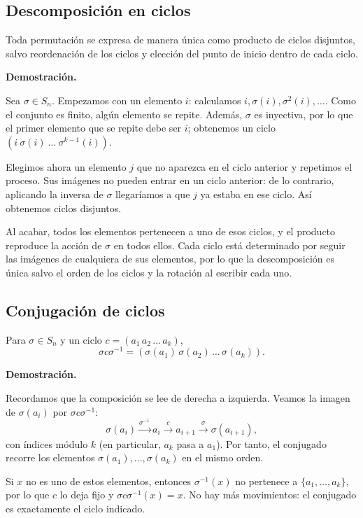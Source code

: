 \documentclass[11pt,a4paper]{article}
\begin{document}
\subsection{Descomposición en ciclos}
\begin{resultado}
Toda permutación se expresa de manera única como producto de ciclos disjuntos, salvo reordenación de los ciclos y elección del punto de inicio dentro de cada ciclo.
\end{resultado}
\textbf{Demostración.}
\begin{demostracion}
Sea $\sigma\in S_n$. Empezamos con un elemento $i$: calculamos $i,\sigma(i),\sigma^2(i),\ldots$. Como el conjunto es finito, algún elemento se repite. Además, $\sigma$ es inyectiva, por lo que el primer elemento que se repite debe ser $i$; obtenemos un ciclo $(i\ \sigma(i)\ \ldots\ \sigma^{k-1}(i))$.

Elegimos ahora un elemento $j$ que no aparezca en el ciclo anterior y repetimos el proceso. Sus imágenes no pueden entrar en un ciclo anterior: de lo contrario, aplicando la inversa de $\sigma$ llegaríamos a que $j$ ya estaba en ese ciclo. Así obtenemos ciclos disjuntos.

Al acabar, todos los elementos pertenecen a uno de esos ciclos, y el producto reproduce la acción de $\sigma$ en todos ellos. Cada ciclo está determinado por seguir las imágenes de cualquiera de sus elementos, por lo que la descomposición es única salvo el orden de los ciclos y la rotación al escribir cada uno.
\end{demostracion}


\subsection{Conjugación de ciclos}
\begin{resultado}
Para $\sigma\in S_n$ y un ciclo $c=(a_1\,a_2\,\ldots\,a_k)$,
\[\sigma c\sigma^{-1}=(\sigma(a_1)\,\sigma(a_2)\,\ldots\,\sigma(a_k)).\]
\end{resultado}
\textbf{Demostración.}
\begin{demostracion}
Recordamos que la composición se lee de derecha a izquierda. Veamos la imagen de $\sigma(a_i)$ por $\sigma c\sigma^{-1}$:
\[\sigma(a_i)\xrightarrow{\sigma^{-1}}a_i\xrightarrow{c}a_{i+1}\xrightarrow{\sigma}\sigma(a_{i+1}),\]
con índices módulo $k$ (en particular, $a_k$ pasa a $a_1$). Por tanto, el conjugado recorre los elementos $\sigma(a_1),\dots,\sigma(a_k)$ en el mismo orden.

Si $x$ no es uno de estos elementos, entonces $\sigma^{-1}(x)$ no pertenece a $\{a_1,\dots,a_k\}$, por lo que $c$ lo deja fijo y $\sigma c\sigma^{-1}(x)=x$. No hay más movimientos: el conjugado es exactamente el ciclo indicado.
\end{demostracion}
\end{document}
